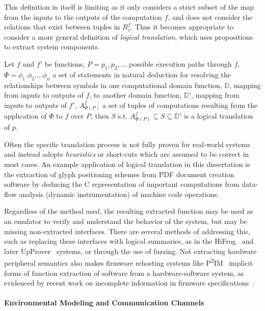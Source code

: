 This definition in itself is limiting as it only considers a strict subset of the map from the inputs to the outputs of the computation $f$, and does not consider the relations that exist between tuples in $R_{v}^{f}$.
Thus it becomes appropriate to consider a more general definition of \emph{logical translation}, which uses propositions to extract system components.

\begin{definition}
\label{def:nested-summarization}
	Let $f$ and $f'$ be functions, $P = p_{1}, p_{2}, \dots $ possible
	execution paths through $f$, $\Phi = \phi_{1} . \phi_{2} . \dots
	\phi_{n}$ a set of statements in natural deduction for resolving the
	relationships between symbols in one computational domain function,
	$\mathbb{D}$, mapping from inputs to outputs of $f$, to another domain
	function, $\mathbb{D}'$, mapping from inputs to outputs of $f'$,
	$A_{\Phi(P)}^{f}$ a set of tuples of computations resulting from the
	application of $\Phi$ to $f$ over $P$, then $S$ s.t. $A_{\Phi(P)}^{f}
	\subseteq S \subseteq \mathbb{D}'$ is a logical translation of
	$p$.
\end{definition}

Often the specific translation process is not fully proven for real-world systems and instead adopts \emph{heuristics} or short-cuts which are assumed to be correct in most cases.
An example application of logical translation in this dissertation is the extraction of glyph positioning schemes from PDF document creation software by deducing the C representation of important computations from data-flow analysis (dynamic instrumentation) of machine code operations.

Regardless of the method used, the resulting extracted function may be used as an emulator to verify and understand the behavior of the system, but may be missing non-extracted interfaces.
There are several methods of addressing this, such as replacing these interfaces with logical summaries, as in the HiFrog~\cite{hifrog} and later UpProver~\cite{upprover} systems, or through the use of fuzzing.
Not extracting hardware peripheral semantics also makes firmware rehosting systems like P\textsuperscript{2}IM~\cite{p2im2020} implicit forms of function extraction of software from a hardware-software system, as evidenced by recent work on incomplete information in firmware specifications~\cite{zhou2022your}.

\paragraph{Environmental Modeling and Communication Channels}

